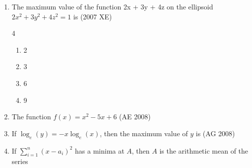 \begin{enumerate}[label=\thesubsection.\arabic*,ref=\thesubsection.\theenumi]
\begin{enumerate}
\begin{enumerate}
\begin{multicols}{4}
    \end{multicols}
    \end{enumerate}
\end{enumerate}
    \item The maximum value of the function 2x + 3y + 4z  on the ellipsoid $2x^2 + 3y^2 + 4z^2 = 1$ is
    \hfill{(2007 XE)}
    \begin{multicols}{4}
    \begin{enumerate}
        \item 2
        \item 3
        \item 6
        \item 9
    \end{enumerate}
\end{multicols}
    \item The function $f(x) = x^2 - 5x + 6$
    \hfill(AE 2008)
    \begin{enumerate}
    \end{enumerate}
\item
 If $\log_e(y) = -x \log_e(x)$, then the maximum value of $y$ is 
 \hfill(AG 2008)
\begin{enumerate}
\end{enumerate}
\item 
 If  $\sum_{i=1}^n (x - a_i)^2$ has a minima at $A$, then $A$ is the arithmetic mean of the series


\end{enumerate}

